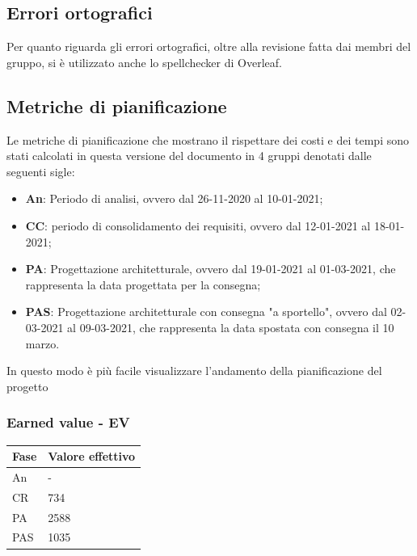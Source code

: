 \subsection{Errori ortografici}

Per quanto riguarda gli errori ortografici, oltre alla revisione fatta dai membri del gruppo, si è utilizzato anche lo spellchecker di Overleaf.
\newpage

\subsection{Metriche di pianificazione}
Le metriche di pianificazione che mostrano il rispettare dei costi e dei tempi sono stati calcolati in questa versione del documento in 4 gruppi denotati dalle seguenti sigle:
\begin{itemize}
    \item \textbf{An}: Periodo di analisi, ovvero dal 26-11-2020 al 10-01-2021;
    \item \textbf{CC}: periodo di consolidamento dei requisiti, ovvero dal 12-01-2021 al 18-01-2021;
    \item \textbf{PA}: Progettazione architetturale, ovvero dal 19-01-2021 al 01-03-2021, che rappresenta la data progettata per la consegna;
    \item \textbf{PAS}: Progettazione architetturale con consegna "a sportello", ovvero dal 02-03-2021 al 09-03-2021, che rappresenta la data spostata con consegna il 10 marzo.
\end{itemize}
In questo modo è più facile visualizzare l'andamento della pianificazione del progetto

\subsubsection{Earned value - EV}

\begin{longtabu} to \textwidth {| X[0.1,c m] | X[0.1,c m] |}
    \hline
    \textbf{Fase} &
    \textbf{Valore effettivo} \\
    \hline
    An & -  \\ 
    \hline
    CR & 734 \\
    \hline
    PA & 2588 \\
    \hline
    PAS & 1035 \\
    \hline 
    \end{longtabu}

